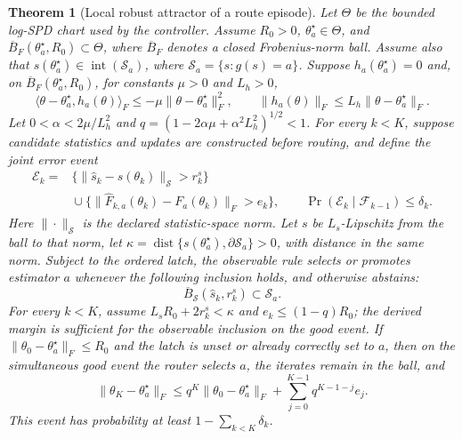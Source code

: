 \documentclass[11pt]{article}
\theoremstyle{plain}
\newtheorem{theorem}{Theorem}
\theoremstyle{definition}
\theoremstyle{remark}
\begin{document}
\begin{theorem}[Local robust attractor of a route episode]\label{thm:attractor}
Let $\Theta$ be the bounded log-SPD chart used by the controller. Assume
$R_0>0$, $\theta_a^\star\in\Theta$, and
$\overline B_F(\theta_a^\star,R_0)\subset\Theta$, where
$\overline B_F$ denotes a closed Frobenius-norm ball. Assume also that
$s(\theta_a^\star)\in\operatorname{int}(\mathcal S_a)$, where
$\mathcal S_a=\{s:g(s)=a\}$. Suppose $h_a(\theta_a^\star)=0$ and, on
$\overline B_F(\theta_a^\star,R_0)$, for constants $\mu>0$ and $L_h>0$,
\[
 \langle\theta-\theta_a^\star,h_a(\theta)\rangle_F
 \le-\mu\|\theta-\theta_a^\star\|_F^2,\qquad
 \|h_a(\theta)\|_F\le L_h\|\theta-\theta_a^\star\|_F.
\]
Let $0<\alpha<2\mu/L_h^2$ and
$q=(1-2\alpha\mu+\alpha^2L_h^2)^{1/2}<1$. For every $k<K$, suppose
candidate statistics and updates are constructed before routing, and define
the joint error event
\[
\begin{aligned}
\mathcal E_k={}&
 \{\|\widehat s_k-s(\theta_k)\|_{\mathcal S}>r_k^s\}\\
 &{}\cup
 \{\|\widehat F_{k,a}(\theta_k)-F_a(\theta_k)\|_F>e_k\},
 \qquad
 \Pr(\mathcal E_k\mid\mathcal F_{k-1})\le\delta_k .
\end{aligned}
\]
Here $\|\cdot\|_{\mathcal S}$ is the declared statistic-space norm. Let $s$ be
$L_s$-Lipschitz from the ball to that norm, let
$\kappa=\operatorname{dist}\{s(\theta_a^\star),
\partial\mathcal S_a\}>0$, with distance in the same norm. Subject to the
ordered latch, the observable rule selects or promotes estimator $a$
whenever the following inclusion holds, and otherwise abstains:
\[
\overline B_{\mathcal S}(\widehat s_k,r_k^s)\subset\mathcal S_a.
\]
For every $k<K$, assume $L_sR_0+2r_k^s<\kappa$ and
$e_k\le(1-q)R_0$; the derived margin is sufficient for the observable
inclusion on the good event.
If $\|\theta_0-\theta_a^\star\|_F\le R_0$ and the latch is unset or already
correctly set to $a$, then on the simultaneous good event the router selects
$a$, the iterates remain in the ball, and
\begin{equation}
 \|\theta_K-\theta_a^\star\|_F
 \le q^K\|\theta_0-\theta_a^\star\|_F
     +\sum_{j=0}^{K-1}q^{K-1-j}e_j.                          \label{eq:contract}
\end{equation}
This event has probability at least $1-\sum_{k<K}\delta_k$.
\end{theorem}
\end{document}
